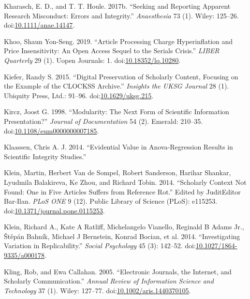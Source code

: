 \documentclass[a5paper]{book}
\begin{document}
\hypertarget{ref-doi:10.1111ux2fanae.14147}{}
Kharasch, E. D., and T. T. Houle. 2017b. ``Seeking and Reporting
Apparent Research Misconduct: Errors and Integrity.'' \emph{Anaesthesia}
73 (1). Wiley: 125--26.
doi:\href{https://doi.org/10.1111/anae.14147}{10.1111/anae.14147}.

\hypertarget{ref-doi:10.18352ux2flq.10280}{}
Khoo, Shaun Yon-Seng. 2019. ``Article Processing Charge Hyperinflation
and Price Insensitivity: An Open Access Sequel to the Serials Crisis.''
\emph{LIBER Quarterly} 29 (1). Uopen Journals: 1.
doi:\href{https://doi.org/10.18352/lq.10280}{10.18352/lq.10280}.

\hypertarget{ref-doi:10.1629ux2fuksg.215}{}
Kiefer, Randy S. 2015. ``Digital Preservation of Scholarly Content,
Focusing on the Example of the CLOCKSS Archive.'' \emph{Insights the
UKSG Journal} 28 (1). Ubiquity Press, Ltd.: 91--96.
doi:\href{https://doi.org/10.1629/uksg.215}{10.1629/uksg.215}.

\hypertarget{ref-doi:10.1108ux2feum0000000007185}{}
Kircz, Joost G. 1998. ``Modularity: The Next Form of Scientific
Information Presentation?'' \emph{Journal of Documentation} 54 (2).
Emerald: 210--35.
doi:\href{https://doi.org/10.1108/eum0000000007185}{10.1108/eum0000000007185}.

\hypertarget{ref-klaassen2014evidential}{}
Klaassen, Chris A. J. 2014. ``Evidential Value in Anova-Regression
Results in Scientific Integrity Studies.''

\hypertarget{ref-doi:10.1371ux2fjournal.pone.0115253}{}
Klein, Martin, Herbert Van de Sompel, Robert Sanderson, Harihar Shankar,
Lyudmila Balakireva, Ke Zhou, and Richard Tobin. 2014. ``Scholarly
Context Not Found: One in Five Articles Suffers from Reference Rot.''
Edited by JuditEditor Bar-Ilan. \emph{PLoS ONE} 9 (12). Public Library
of Science (PLoS): e115253.
doi:\href{https://doi.org/10.1371/journal.pone.0115253}{10.1371/journal.pone.0115253}.

\hypertarget{ref-doi:10.1027ux2f1864-9335ux2fa000178}{}
Klein, Richard A., Kate A Ratliff, Michelangelo Vianello, Reginald B
Adams Jr., Štěpán Bahník, Michael J Bernstein, Konrad Bocian, et al.
2014. ``Investigating Variation in Replicability.'' \emph{Social
Psychology} 45 (3): 142--52.
doi:\href{https://doi.org/10.1027/1864-9335/a000178}{10.1027/1864-9335/a000178}.

\hypertarget{ref-doi:10.1002ux2faris.1440370105}{}
Kling, Rob, and Ewa Callahan. 2005. ``Electronic Journals, the Internet,
and Scholarly Communication.'' \emph{Annual Review of Information
Science and Technology} 37 (1). Wiley: 127--77.
doi:\href{https://doi.org/10.1002/aris.1440370105}{10.1002/aris.1440370105}.
\end{document}
